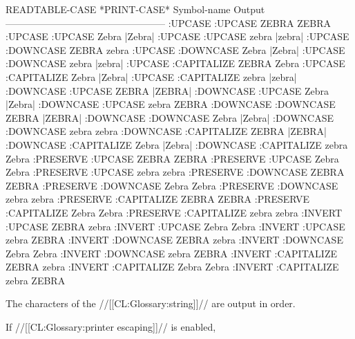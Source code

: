 \code
    READTABLE-CASE *PRINT-CASE*  Symbol-name  Output
    --------------------------------------------------
    :UPCASE        :UPCASE       ZEBRA        ZEBRA
    :UPCASE        :UPCASE       Zebra        |Zebra|
    :UPCASE        :UPCASE       zebra        |zebra|
    :UPCASE        :DOWNCASE     ZEBRA        zebra
    :UPCASE        :DOWNCASE     Zebra        |Zebra|
    :UPCASE        :DOWNCASE     zebra        |zebra|
    :UPCASE        :CAPITALIZE   ZEBRA        Zebra
    :UPCASE        :CAPITALIZE   Zebra        |Zebra|
    :UPCASE        :CAPITALIZE   zebra        |zebra|
    :DOWNCASE      :UPCASE       ZEBRA        |ZEBRA|
    :DOWNCASE      :UPCASE       Zebra        |Zebra|
    :DOWNCASE      :UPCASE       zebra        ZEBRA
    :DOWNCASE      :DOWNCASE     ZEBRA        |ZEBRA|
    :DOWNCASE      :DOWNCASE     Zebra        |Zebra|
    :DOWNCASE      :DOWNCASE     zebra        zebra
    :DOWNCASE      :CAPITALIZE   ZEBRA        |ZEBRA|
    :DOWNCASE      :CAPITALIZE   Zebra        |Zebra|
    :DOWNCASE      :CAPITALIZE   zebra        Zebra
    :PRESERVE      :UPCASE       ZEBRA        ZEBRA
    :PRESERVE      :UPCASE       Zebra        Zebra
    :PRESERVE      :UPCASE       zebra        zebra
    :PRESERVE      :DOWNCASE     ZEBRA        ZEBRA
    :PRESERVE      :DOWNCASE     Zebra        Zebra
    :PRESERVE      :DOWNCASE     zebra        zebra
    :PRESERVE      :CAPITALIZE   ZEBRA        ZEBRA
    :PRESERVE      :CAPITALIZE   Zebra        Zebra
    :PRESERVE      :CAPITALIZE   zebra        zebra
    :INVERT        :UPCASE       ZEBRA        zebra
    :INVERT        :UPCASE       Zebra        Zebra
    :INVERT        :UPCASE       zebra        ZEBRA
    :INVERT        :DOWNCASE     ZEBRA        zebra
    :INVERT        :DOWNCASE     Zebra        Zebra
    :INVERT        :DOWNCASE     zebra        ZEBRA
    :INVERT        :CAPITALIZE   ZEBRA        zebra
    :INVERT        :CAPITALIZE   Zebra        Zebra
    :INVERT        :CAPITALIZE   zebra        ZEBRA \endcode

\endsubsubsubsubsection%

\endsubsubsubsection%

\endsubsubsection%

The characters of the //[[CL:Glossary:string]]// are output in order. 

If //[[CL:Glossary:printer escaping]]// is enabled,


